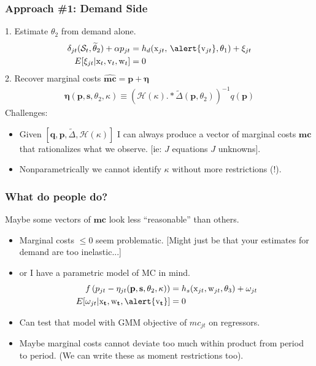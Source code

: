 \begin{frame}
\frametitle{Approach \#1: Demand Side}
1. Estimate $\theta_2$ from demand alone.
\begin{align*}
\delta_{jt}(\mathcal{S}_t,\widetilde{\theta}_2) + \alpha p_{jt} &= h_d(\textrm{x}_{jt}, \, \alert{\textrm{v}_{jt}},\theta_1)  + \xi_{jt} \\
E[\xi_{jt} | \textrm{x}_{t}, \textrm{v}_{t}, \textrm{w}_{t}] &=0
\end{align*}
2. Recover marginal costs $\widehat{\mathbf{mc}} = \mathbf{p} + \boldsymbol{\eta}$
\begin{align*}
\boldsymbol{\eta}(\mathbf{p},\mathbf{s},\theta_2,\kappa) \equiv \left(\mathcal{H}(\kappa).*\tilde{\Delta}(\mathbf{p},\theta_2) \right)^{-1} q(\mathbf{p})
\end{align*}
\vspace{-0.2cm}
Challenges:
\begin{itemize}
\item Given $[\mathbf{q},\mathbf{p},\tilde{\Delta},\mathcal{H}(\kappa)]$ I can always produce a vector of marginal costs $\mathbf{mc}$ that rationalizes what we observe. [ie: $J$ equations $J$ unknowns].
\item Nonparametrically we cannot identify $\kappa$ without more restrictions (!).
\end{itemize}
\end{frame}



\begin{frame}\frametitle{What do people do?}
Maybe some vectors of $\mathbf{mc}$ look less ``reasonable'' than others.
\begin{itemize}
\item Marginal costs $\leq 0$ seem problematic.
[Might just be that your estimates for demand are too inelastic...]
\item or I have a parametric model of MC in mind. 
\begin{align*}
 f \left( p_{jt} - \eta_{jt}(\mathbf{p},\mathbf{s},\theta_2,\kappa) \right) &= h_s(\textrm{x}_{jt}, \textrm{w}_{jt},\theta_3) + \omega_{jt}\\
 E[\omega_{jt} | \mathbf{\textrm{x}_{t}}, \mathbf{\textrm{w}_{t}}, \alert{\mathbf{\textrm{v}_{t}}}]&=0
\end{align*}
\item Can test that model with GMM objective of $mc_{jt}$ on regressors.
\item Maybe marginal costs cannot deviate too much within product from period to period. (We can write these as moment restrictions too).
\end{itemize}
\end{frame}

